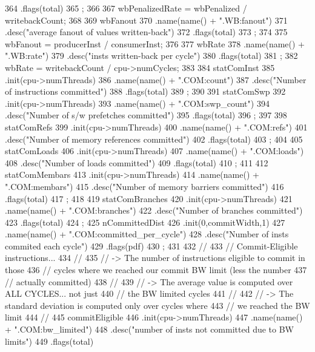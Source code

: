 \begin{DoxyCode}
{364         .flags(total)
365         ;
366 
367     wbPenalizedRate = wbPenalized / writebackCount;
368 
369     wbFanout
370         .name(name() + ".WB:fanout")
371         .desc("average fanout of values written-back")
372         .flags(total)
373         ;
374 
375     wbFanout = producerInst / consumerInst;
376 
377     wbRate
378         .name(name() + ".WB:rate")
379         .desc("insts written-back per cycle")
380         .flags(total)
381         ;
382     wbRate = writebackCount / cpu->numCycles;
383 
384     statComInst
385         .init(cpu->numThreads)
386         .name(name() + ".COM:count")
387         .desc("Number of instructions committed")
388         .flags(total)
389         ;
390 
391     statComSwp
392         .init(cpu->numThreads)
393         .name(name() + ".COM:swp_count")
394         .desc("Number of s/w prefetches committed")
395         .flags(total)
396         ;
397 
398     statComRefs
399         .init(cpu->numThreads)
400         .name(name() +  ".COM:refs")
401         .desc("Number of memory references committed")
402         .flags(total)
403         ;
404 
405     statComLoads
406         .init(cpu->numThreads)
407         .name(name() +  ".COM:loads")
408         .desc("Number of loads committed")
409         .flags(total)
410         ;
411 
412     statComMembars
413         .init(cpu->numThreads)
414         .name(name() +  ".COM:membars")
415         .desc("Number of memory barriers committed")
416         .flags(total)
417         ;
418 
419     statComBranches
420         .init(cpu->numThreads)
421         .name(name() + ".COM:branches")
422         .desc("Number of branches committed")
423         .flags(total)
424         ;
425     nCommittedDist
426         .init(0,commitWidth,1)
427         .name(name() + ".COM:committed_per_cycle")
428         .desc("Number of insts commited each cycle")
429         .flags(pdf)
430         ;
431 
432     //
433     //  Commit-Eligible instructions...
434     //
435     //  -> The number of instructions eligible to commit in those
436     //  cycles where we reached our commit BW limit (less the number
437     //  actually committed)
438     //
439     //  -> The average value is computed over ALL CYCLES... not just
440     //  the BW limited cycles
441     //
442     //  -> The standard deviation is computed only over cycles where
443     //  we reached the BW limit
444     //
445     commitEligible
446         .init(cpu->numThreads)
447         .name(name() + ".COM:bw_limited")
448         .desc("number of insts not committed due to BW limits")
449         .flags(total)
}
\end{DoxyCode}
